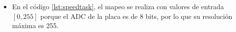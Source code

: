 \begin{itemize}
  \item En el código \ref{lst:speedtask}, el mapeo se realiza con valores
        de entrada $\left[0, 255\right]$ porque el ADC de la placa
        es de 8 bits, por lo que su resolución máxima es 255.
\end{itemize}